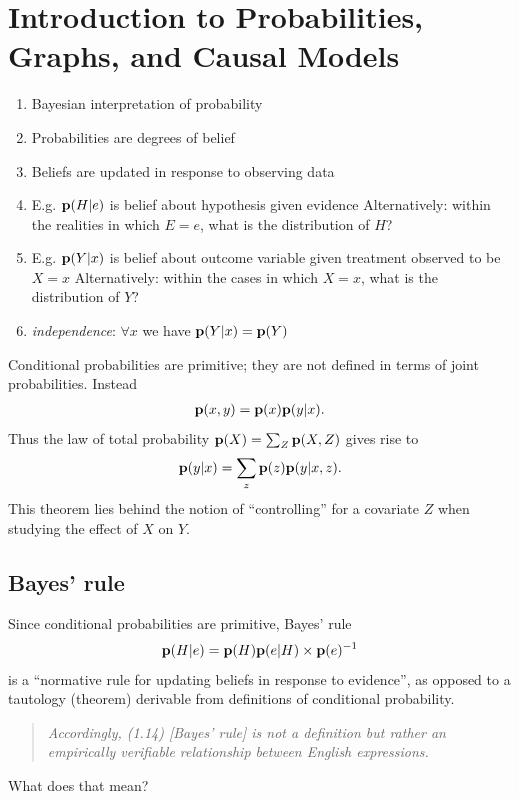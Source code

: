 \section{Introduction to Probabilities, Graphs, and Causal Models}

\begin{enumerate}
\item Bayesian interpretation of probability
\item Probabilities are degrees of belief
\item Beliefs are updated in response to observing data
\item E.g. $\mathbf{p}(H|e)$ is belief about hypothesis given evidence
  Alternatively: within the realities in which $E=e$, what is the distribution of $H$?
\item E.g. $\mathbf{p}(Y|x)$ is belief about outcome variable given treatment observed to be $X=x$
  Alternatively: within the cases in which $X=x$, what is the distribution of $Y$?
\item {\it independence}: $\forall x$ we have $\mathbf{p}(Y|x) = \mathbf{p}(Y)$
\end{enumerate}

Conditional probabilities are primitive; they are not defined in terms of joint probabilities. Instead
\begin{align*}
  \mathbf{p}(x, y) = \mathbf{p}(x)\mathbf{p}(y|x).
\end{align*}
Thus the law of total probability $\mathbf{p}(X) = \sum_Z\mathbf{p}(X, Z)$ gives rise to
\begin{align*}
  \mathbf{p}(y|x) = \sum_z \mathbf{p}(z)\mathbf{p}(y|x,z).
\end{align*}
This theorem lies behind the notion of ``controlling'' for a covariate $Z$ when studying the effect of $X$ on $Y$.

\subsection{Bayes' rule}

Since conditional probabilities are primitive, Bayes' rule
\begin{align*}
  \mathbf{p}(H|e) = \mathbf{p}(H) \mathbf{p}(e|H) \times \mathbf{p}(e)^{-1}
\end{align*}
is a ``normative rule for updating beliefs in response to evidence'', as opposed to a tautology (theorem) derivable from definitions of conditional probability.

\begin{quote}
  {\it Accordingly, (1.14) [Bayes' rule] is not a definition but rather an empirically verifiable relationship
    between English expressions.}
\end{quote}
\begin{question}
  What does that mean?
\end{question}

